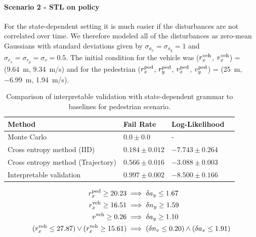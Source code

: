 \paragraph{Scenario 2 - STL on policy}

For the state-dependent setting it is much easier if the disturbances are not correlated over time. We therefore modeled all of the disturbances as zero-mean Gaussians with standard deviations given by $\sigma_{a_x} = \sigma_{a_y} = 1$ and $\sigma_{r_x} = \sigma_{r_y} = \sigma_{v} = 0.5$. The initial condition for the vehicle was ($r_x^{\rm veh}$, $v_x^{\rm veh}$) = (\SI{9.64}{m}, \SI{9.34}{m/s}) and for the pedestrian ($r^{\rm ped}_x$, $r^{\rm ped}_y$, $v^{\rm ped}_x$, $v^{\rm ped}_y$) = (\SI{25}{m}, \SI{-6.99}{m}, \SI{1.94}{m/s}). 

\begin{table}
    \centering
    \caption{Comparison of interpretable validation with state-dependent grammar to baselines for pedestrian scenario.}
    \label{tab:ped_results_state_dependent}
    \begin{tabular}{@{}llll@{}} 
        \toprule
        \textbf{Method} & \textbf{Fail Rate} & \textbf{Log-Likelihood} \\
        \midrule
        Monte Carlo & $0.0 \pm 0.0$ &  -   \\
        Cross entropy method (IID) & $0.184 \pm 0.012$ & $-7.743 \pm 0.264$\\
        Cross entropy method (Trajectory) & $0.566 \pm 0.016$ & $-3.088 \pm 0.003$ \\
        Interpretable validation & $0.997 \pm 0.002$ & $-8.500 \pm 0.166$ \\
        \bottomrule
    \end{tabular}
\end{table}



\begin{equation}
\begin{split}
r_x^{\rm ped} \geq 20.23 &\implies \delta a_y \leq 1.67 \\
r_x^{\rm veh} \geq 16.51 &\implies \delta n_y \geq 1.59 \\
v^{\rm veh} \geq 0.26 &\implies \delta a_y \geq 1.10 \\
(r_x^{\rm veh} \leq 27.87) \lor (r_x^{\rm veh} \geq 15.61) &\implies (\delta n_v \leq 0.20) \land (\delta a_x \leq 1.91)
\end{split} \label{eq:failure_description_ped_state_dep}
\end{equation}

